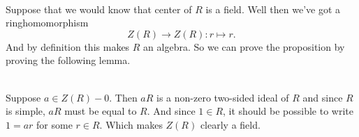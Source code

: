 \\

Suppose that we would know that center of $R$ is a field. Well then we've got a ringhomomorphism 
\[Z(R) \to Z(R) : r \mapsto r .\]
And by definition this makes $R$ an algebra. So we can prove the proposition by proving the following lemma. 

\\

Suppose $a\in Z(R)-{0}$. Then $aR$ is a non-zero two-sided ideal of $R$ and since $R$ is simple, $aR$ must be equal to $R$. And since $1 \in R$, it should be possible to write $1 = ar$ for some $r\in R$. Which makes $Z(R)$ clearly a field. 
\\